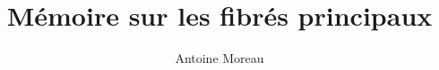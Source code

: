 \documentclass[a4paper,10pt]{report}
\title{M\'emoire sur les fibr\'es principaux}
\author{Antoine Moreau}
\begin{document}
\maketitle

\begin{abstract}

\end{abstract}




\appendix

%



\end{document}
